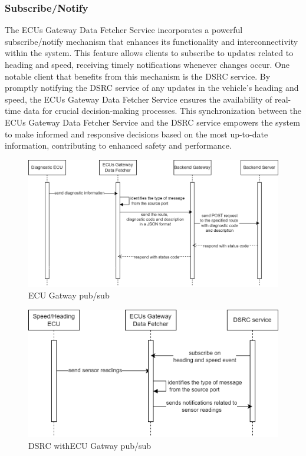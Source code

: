 \documentclass[
12pt,
oneside, 
onehalfspacing, 
nolistspacing, 
parskip, 
chapterinoneline, 
]{AASTCOMPUTER}
\begin{document}
\subsubsection{Subscribe/Notify}
The ECUs Gateway Data Fetcher Service incorporates a powerful subscribe/notify mechanism that enhances its functionality and interconnectivity within the system. This feature allows clients to subscribe to updates related to heading and speed, receiving timely notifications whenever changes occur. One notable client that benefits from this mechanism is the DSRC service. By promptly notifying the DSRC service of any updates in the vehicle's heading and speed, the ECUs Gateway Data Fetcher Service ensures the availability of real-time data for crucial decision-making processes. This synchronization between the ECUs Gateway Data Fetcher Service and the DSRC service empowers the system to make informed and responsive decisions based on the most up-to-date information, contributing to enhanced safety and performance.
\begin{figure}[!ht]
\centering
\includegraphics[scale=0.4]{Figures/28.png}
\caption[ECU Gatway pub/sub]{ECU Gatway pub/sub}
\label{fig:TCU}
\end{figure}
\begin{figure}[!ht]
\centering
\includegraphics[scale=0.4]{Figures/29.png}
\caption[DSRC withECU Gatway pub/sub]{DSRC withECU Gatway pub/sub}
\label{fig:TCU}
\end{figure}
\end{document}
